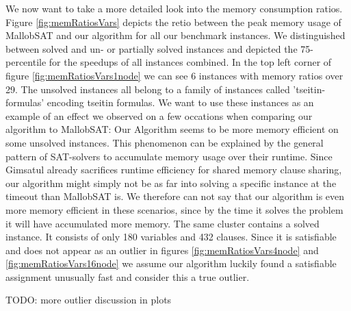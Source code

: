 \documentclass[12pt,a4paper,twoside]{scrartcl}
\numberwithin{equation}{section}
\begin{document}
We now want to take a more detailed look into the memory consumption ratios. Figure \ref{fig:memRatiosVars} depicts the retio between the peak memory usage of MallobSAT and our algorithm for all our benchmark instances. We distinguished between solved and un- or partially solved instances and depicted the 75-percentile for the speedups of all instances combined.
In the top left corner of figure \ref{fig:memRatiosVars1node} we can see 6 instances with memory ratios over 29. The unsolved instances all belong to a family of instances called 'tseitin-formulas' encoding tseitin formulas. We want to use these instances as an example of an effect we observed on a few occations when comparing our algorithm to MallobSAT: Our Algorithm seems to be more memory efficient on some unsolved instances. This phenomenon can be explained by the general pattern of SAT-solvers to accumulate memory usage over their runtime. Since Gimsatul already sacrifices runtime efficiency for shared memory clause sharing, our algorithm might simply not be as far into solving a specific instance at the timeout than MallobSAT is. We therefore can not say that our algorithm is even more memory efficient in these scenarios, since by the time it solves the problem it will have accumulated more memory.
The same cluster contains a solved instance. It consists of only 180 variables and 432 clauses. Since it is satisfiable and does not appear as an outlier in figures \ref{fig:memRatiosVars4node} and \ref{fig:memRatiosVars16node} we assume our algorithm luckily found a satisfiable assignment unusually fast and consider this a true outlier.

TODO: more outlier discussion in plots
\end{document}

